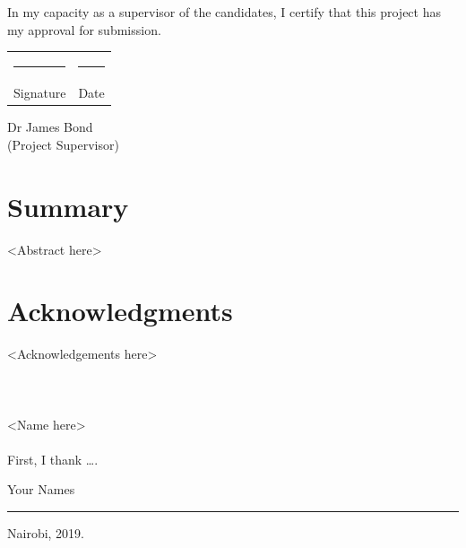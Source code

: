 \documentclass[12pt,a4paper]{report}
\begin{document}
In my capacity as  a supervisor of the candidates, I certify that this project has my approval for submission.
\vspace{0.5in}


\begin{center}
\begin{tabular}{cc}
 \rule{5cm}{1pt} &  \rule{5cm}{1pt}\\
Signature & Date
\end{tabular}
\end{center}




\begin{flushright}
Dr James Bond\\
(Project Supervisor)\\[1.5cm]

\end{flushright}



\newpage
\mbox{}
\vspace{2in}
\chapter*{Summary}  %
<Abstract here>





\tableofcontents
\listoffigures

\newpage




\cleardoublepage
{}
{}
\chapter*{Acknowledgments}
\vspace{1.0in}
<Acknowledgements here>
\\
\\
\\ 
\\
<Name here> \\ 
\\
First, I thank \ldots.\vspace{8mm}
\begin{flushright} Your Names\\
\rule{\textwidth}{0.5pt}
 Nairobi, 2019.\end{flushright}
\newpage
\end{document}
